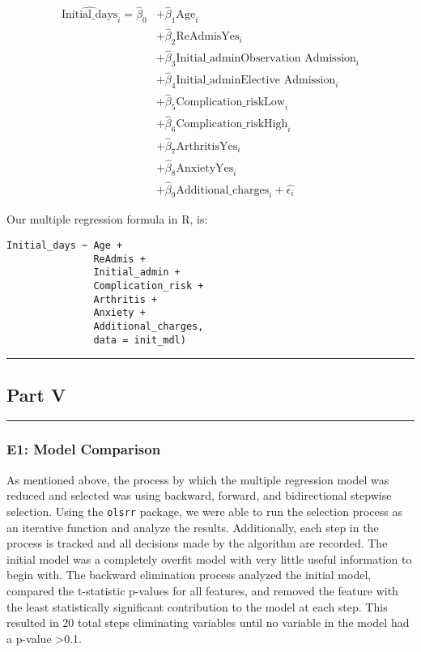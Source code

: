 \documentclass[
]{article}
\begin{document}
\[
\begin{align}
\hat{\text{Initial_days}}_i = \hat{\beta}_0
    &+ \hat{\beta}_1 \text{Age}_i \\
    &+ \hat{\beta}_2 \text{ReAdmisYes}_i \\
    &+ \hat{\beta}_3 \text{Initial_adminObservation Admission}_i \\
    &+ \hat{\beta}_4 \text{Initial_adminElective Admission}_i \\
    &+ \hat{\beta}_5 \text{Complication_riskLow}_i \\
    &+ \hat{\beta}_6 \text{Complication_riskHigh}_i \\
    &+ \hat{\beta}_7 \text{ArthritisYes}_i \\
    &+ \hat{\beta}_8 \text{AnxietyYes}_i \\
    &+ \hat{\beta}_9 \text{Additional_charges}_i + \hat{\epsilon_i}
\end{align}
\]

Our multiple regression formula in \(\mbox{R}\), is:

\begin{verbatim}
Initial_days ~ Age + 
               ReAdmis + 
               Initial_admin + 
               Complication_risk + 
               Arthritis + 
               Anxiety + 
               Additional_charges, 
               data = init_mdl)
\end{verbatim}

\begin{center}\rule{0.5\linewidth}{0.5pt}\end{center}

\hypertarget{part-v}{%
\subsection{Part V}\label{part-v}}

\begin{center}\rule{0.5\linewidth}{0.5pt}\end{center}

\hypertarget{e1-model-comparison}{%
\subsubsection{E1: Model Comparison}\label{e1-model-comparison}}

As mentioned above, the process by which the multiple regression model
was reduced and selected was using backward, forward, and bidirectional
stepwise selection. Using the \texttt{olsrr} package, we were able to
run the selection process as an iterative function and analyze the
results. Additionally, each step in the process is tracked and all
decisions made by the algorithm are recorded. The initial model was a
completely overfit model with very little useful information to begin
with. The backward elimination process analyzed the initial model,
compared the t-statistic p-values for all features, and removed the
feature with the least statistically significant contribution to the
model at each step. This resulted in 20 total steps eliminating
variables until no variable in the model had a p-value \textgreater0.1.
\end{document}
